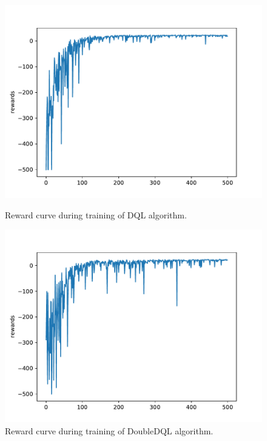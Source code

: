 \documentclass{article}
\begin{document}
\begin{figure}
	\includegraphics[width=\textwidth]{rewards_per_epoch_gdim-16_gamma-0.85_nepisodes-500_explorationstop-0.25_b-32_dql-False}
	\caption{Reward curve during training of DQL algorithm.}
	\label{fig:dqlreward}
	
	\includegraphics[width=\textwidth]{rewards_per_epoch_gdim-16_gamma-0.85_nepisodes-500_explorationstop-0.25_b-32_dql-True}
	\caption{Reward curve during training of DoubleDQL algorithm.}
	\label{fig:doubledqlreward}
\end{figure}
\end{document}
